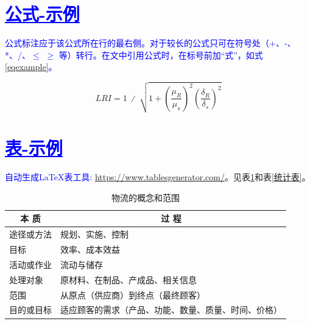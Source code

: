 \section{\textcolor{blue}{\underline{\underline{公式-示例}}}}

\textcolor{blue}{公式标注应于该公式所在行的最右侧。对于较长的公式只可在符号处（+、-、*、/、$\leqslant$ $\geqslant$ 等）转行。在文中引用公式时，在标号前加“式”，如式\ref{eqexample}。}


\begin{equation}
    LRI=1\ ∕\ \sqrt{ 1 + {\left(\frac{{\mu}_{R}}{{\mu}_{s}}\right)^{2}}{\left(\frac{{\delta}_{R}}{{\delta}_{s}}\right)^{2}} }
    \label{eqexample}
\end{equation}

\section{\textcolor{blue}{\underline{\underline{表-示例}}}}

\textcolor{blue}{{自动生成LaTeX表工具: \url{https://www.tablesgenerator.com/}}}。见表\ref{物流的概念和范围}和表\ref{统计表}。

\begin{table}[htbp]
  \linespread{1.5}
  \songti
  \centering
  \caption{物流的概念和范围}\label{物流的概念和范围}
  \begin{tabular}{|l|l|}
  \hline
  \multicolumn{1}{|c|}{本 质} & \multicolumn{1}{c|}{过  程}  \\ \hline
  途径或方法                     & 规划、实施、控制                   \\ \hline
  目标                        & 效率、成本效益                    \\ \hline
  活动或作业                     & 流动与储存                      \\ \hline
  处理对象                      & 原材料、在制品、产成品、相关信息           \\ \hline
  范围                        & 从原点（供应商）到终点（最终顾客）          \\ \hline
  目的或目标                     & 适应顾客的需求（产品、功能、数量、质量、时间、价格） \\ \hline
  \end{tabular}
\end{table}

